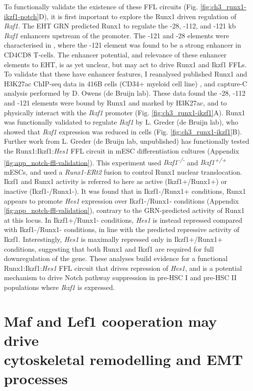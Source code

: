 To functionally validate the existence of these FFL circuits (Fig. \ref{fig:ch3_runx1-ikzf1-notch}D), it is first important to explore the Runx1 driven regulation of \textit{Ikzf1}. The EHT GRN predicted Runx1 to regulate the -28, -112, and -121 kb \textit{Ikzf1} enhancers upstream of the promoter. The -121 and -28 elements were characterised in \cite{alomairi_integration_2020}, where the -121 element was found to be a strong enhancer in CD4\upos{}CD8\upos{} T-cells. The enhancer potential, and relevance of these enhancer elements to EHT, is as yet unclear, but may act to drive Runx1 and Ikzf1 FFLs. To validate that these have enhancer features, I reanalysed published Runx1 and H3K27ac ChIP-seq data in 416B cells (CD34+ myeloid cell line) \citep{schutte_experimentally_2016}, and capture-C analysis performed by D. Owens (de Bruijn lab). These data found the -28, -112 and -121 elements were bound by Runx1 and marked by H3K27ac, and to physically interact with the \textit{Ikzf1} promoter (Fig. \ref{fig:ch3_runx1-ikzf1}A). Runx1 was functionally validated to regulate \textit{Ikzf1} by L. Greder (de Bruijn lab), who showed that \textit{Ikzf1} expression was reduced in \runxnull{} cells (Fig. \ref{fig:ch3_runx1-ikzf1}B). Further work from L. Greder (de Bruijn lab, unpublished) has functionally tested the Runx1:Ikzf1:\textit{Hes1} FFL circuit in mESC differentiation cultures (Appendix \ref{fig:app_notch-ffl-validation}). This experiment used \textit{Ikzf1\textsuperscript{-/-}} and \textit{Ikzf1\textsuperscript{+/+}} mESCs, and used a \textit{Runx1-ERt2} fusion to control Runx1 nuclear translocation. Ikzf1 and Runx1 activity is referred to here as active (Ikzf1+/Runx1+) or inactive (Ikzf1-/Runx1-). It was found that in Ikzf1-/Runx1+ conditions, Runx1 appears to promote \textit{Hes1} expression over Ikzf1-/Runx1- conditions (Appendix \ref{fig:app_notch-ffl-validation}), contrary to the GRN-predicted activity of Runx1 at this locus. In Ikzf1+/Runx1- conditions, \textit{Hes1} is instead repressed compared with Ikzf1-/Runx1- conditions, in line with the predicted repressive activity of Ikzf1. Interestingly, \textit{Hes1} is maximally repressed only in Ikzf1+/Runx1+ conditions, suggesting that both Runx1 and Ikzf1 are required for full downregulation of the gene. These analyses build evidence for a functional Runx1:Ikzf1:\textit{Hes1} FFL circuit that drives repression of \textit{Hes1}, and is a potential mechanism to drive Notch pathway suppression in pre-HSC I and pre-HSC II populations where \textit{Ikzf1} is expressed.


\section[Maf and Lef1 cooperation may drive cytoskeletal remodelling and EMT processes]{\label{ch3:maf-lef1}Maf and Lef1 cooperation may drive\\cytoskeletal remodelling and EMT processes}

